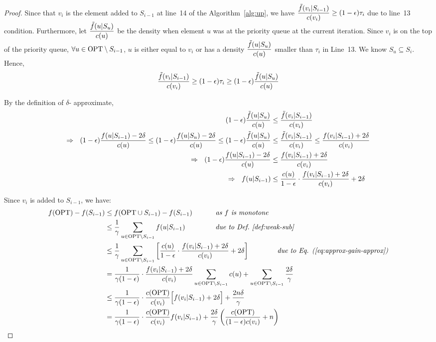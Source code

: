 \documentclass[10pt]{article} %
\theoremstyle{remark}
\newcommand{\OPT}{{\rm OPT}}
\begin{document}
\begin{proof} 
Since that $v_i$ is the element added to $S_{i-1}$ at line~14 of the Algorithm~\ref{alg:up}, we have
$\displaystyle\frac{\Tilde{f}(v_i|S_{i-1})}{c(v_i)}\geq {(1-\epsilon)\tau_i}$ due to line~13 condition. Furthermore, let $\displaystyle\frac{\Tilde{f}(u|S_u)}{c(u)}$ be the density when element $u$ was at the priority queue at the current iteration. Since $v_i$ is on the top of the priority queue, 
$\forall u \in \OPT \setminus S_{i-1}$, $u$ is either equal to $v_i$ or has a density $\displaystyle\frac{\Tilde{f}(u|S_u)}{c(u)}$ smaller than $\tau_i$
in Line~13. We know $S_u \subseteq S_i$. Hence, 
\begin{equation}
\frac{\Tilde{f}(v_i|S_{i-1})}{c(v_i)}\geq {(1-\epsilon)\tau_i} \geq (1-\epsilon) \frac{\Tilde{f}(u|S_{u})}{c(u)}
\label{eq:i-2-approx}
\end{equation}

By the definition of $\delta$- approximate, 
\begin{align}
    (1-\epsilon) \frac{\Tilde{f}(u|S_{u})}{c(u)} &\leq \frac{\Tilde{f}(v_i|S_{i-1})}{c(v_i)} \nonumber \\
    \Rightarrow~~  (1-\epsilon) \frac{f(u|S_{i-1})-2\delta}{c(u)} \leq (1-\epsilon) \frac{f(u|S_{u})-2\delta}{c(u)} \leq (1-\epsilon) \frac{\Tilde{f}(u|S_{u})}{c(u)} &\leq \frac{\Tilde{f}(v_i|S_{i-1})}{c(v_i)} \leq \frac{f(v_i|S_{i-1})+2\delta}{c(v_i)} \nonumber\\
    \Rightarrow~~  (1-\epsilon) \frac{f(u|S_{i-1})-2\delta}{c(u)} &\leq \frac{f(v_i|S_{i-1})+2\delta}{c(v_i)} \nonumber\\
    \Rightarrow~~  f(u|S_{i-1}) &\leq \frac{c(u)}{1-\epsilon} \cdot \frac{f(v_i|S_{i-1})+2\delta}{c(v_i)}+2\delta
    \label{eq:approx-gain-approx}
\end{align}


Since $v_i$ is added to $S_{i-1}$, we have: 
\begin{align*}
     f(\OPT)-f(S_{i-1})  &\leq f(\OPT \cup S_{i-1})-f(S_{i-1})  \ \quad\quad\quad \mbox{\it as $f$ is monotone}\\
    &\leq \frac{1}{\gamma} \sum_{u\in \OPT \setminus S_{i-1}} f(u|S_{i-1}) \ \quad\quad\quad\quad \mbox{\it due to Def.~\ref{def:weak-sub}} \\
    &\leq \frac{1}{\gamma} \sum_{u\in \OPT \setminus S_{i-1}} \left[\frac{c(u)}{1-\epsilon} \cdot \frac{f(v_i|S_{i-1})+2\delta}{c(v_i)}+2\delta \right] \quad\quad\quad\quad\mbox{\it  due to Eq. (\ref{eq:approx-gain-approx})} \\
    &=\frac{1}{\gamma(1-\epsilon)} \cdot \frac{f(v_i|S_{i-1})+2\delta}{c(v_i)} \sum_{u\in \OPT \setminus S_{i-1}} c(u) + \sum_{u\in \OPT \setminus S_{i-1}} \frac{2\delta}{\gamma}  \\
    &\leq \frac{1}{\gamma(1-\epsilon)} \cdot \frac{c(\OPT)}{c(v_i)} \Big[f(v_i|S_{i-1})+2\delta \Big]  + \frac{2n\delta}{\gamma}\\
    &= \frac{1}{\gamma(1-\epsilon)} \cdot \frac{c(\OPT)}{c(v_i)} f(v_i|S_{i-1}) + \frac{2\delta}{\gamma} \left( \frac{c(\OPT)}{(1-\epsilon)c(v_i)} + n\right)
\end{align*}


\end{proof}
\end{document}

